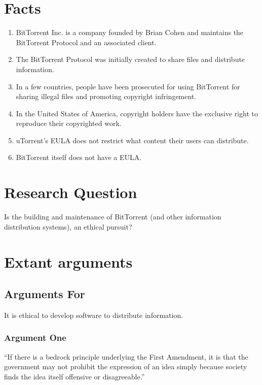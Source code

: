\documentclass[11pt]{article}
\begin{document}
\section{Facts}
\begin{enumerate}
\item BitTorrent Inc. is a company founded by Brian Cohen and maintains the BitTorrent Protocol and an associated client. \cite{btabout}
\item The BitTorrent Protocol was initially created to share files and distribute information. \cite{btabout}
\item In a few countries, people have been prosecuted for using BitTorrent for sharing illegal files and promoting copyright infringement. \cite{tpbverdict}
\item In the United States of America, copyright holders have the exclusive right to reproduce their copyrighted work. \cite{t17c1s106}
\item uTorrent's EULA does not restrict what content their users can distribute. \cite{utorrentEula}
\item BitTorrent itself does not have a EULA. \cite{utorrentEula}
\end{enumerate}

\section{Research Question}
Is the building and maintenance of BitTorrent (and other information distribution systems), an ethical pursuit?

\section{Extant arguments}

\subsection{Arguments For}
It is ethical to develop software to distribute information.

\subsubsection{Argument One}
``If there is a bedrock principle underlying the First Amendment, it is that the government may not prohibit the expression of an idea simply because society finds the idea itself offensive or disagreeable.'' \cite[414]{1989texas}
\end{document}
